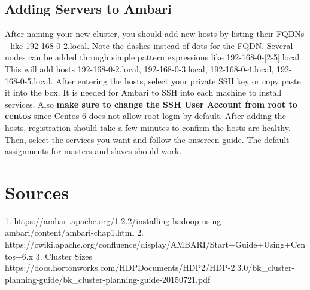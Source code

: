 \documentclass[9pt,twocolumn,twoside]{idsi}
\begin{document}
\subsection{Adding Servers to Ambari}
After naming your new cluster, you should add new hosts by listing their FQDNs - like 192-168-0-2.local. Note the dashes instead of dots for the FQDN. Several nodes can be added through simple pattern expressions like 192-168-0-[2-5].local . This will add hosts 192-168-0-2.local, 192-168-0-3.local, 192-168-0-4.local, 192-168-0-5.local. After entering the hosts, select your private SSH key or copy paste it into the box. It is needed for Ambari to SSH into each machine to install services. Also \textbf{make sure to change the SSH User Account from root to centos} since Centos 6 does not allow root login by default. After adding the hosts, registration should take a few minutes to confirm the hosts are healthy. Then, select the services you want and follow the onscreen guide. The default assignments for masters and slaves should work.



\section{Sources}
1. https://ambari.apache.org/1.2.2/installing-hadoop-using-ambari/content/ambari-chap1.html
2. https://cwiki.apache.org/confluence/display/AMBARI/Start+Guide+Using+Centos+6.x
3. Cluster Sizes https://docs.hortonworks.com/HDPDocuments/HDP2/HDP-2.3.0/bk_cluster-planning-guide/bk_cluster-planning-guide-20150721.pdf
\end{document}
